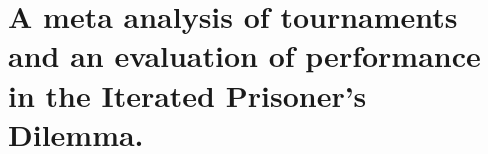 \chapter{A meta analysis of tournaments and an evaluation of performance in the
Iterated Prisoner's Dilemma.}\label{chapter:meta_tournaments}





